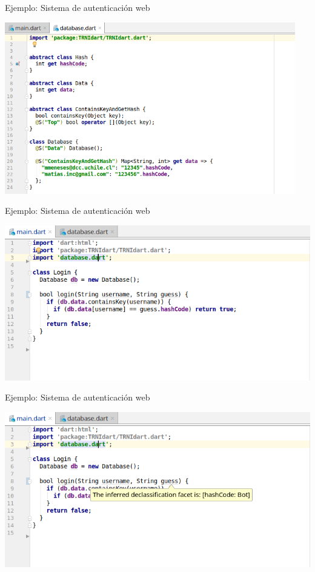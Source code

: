 \documentclass[aspectratio=169,10pt]{beamer}
\begin{document}
\begin{frame}[fragile]{Ejemplo: Sistema de autenticación web}
	\begin{center}
		\includegraphics[width=0.95\textwidth]{images/database.png}
	\end{center}
\end{frame}

\begin{frame}[fragile]{Ejemplo: Sistema de autenticación web}
	\begin{center}
		\includegraphics[width=1.0\textwidth]{images/login1.png}
	\end{center}
\end{frame}

\begin{frame}[fragile]{Ejemplo: Sistema de autenticación web}
	\begin{center}
		\includegraphics[width=1.0\textwidth]{images/login2.png}
	\end{center}
\end{frame}
\end{document}
